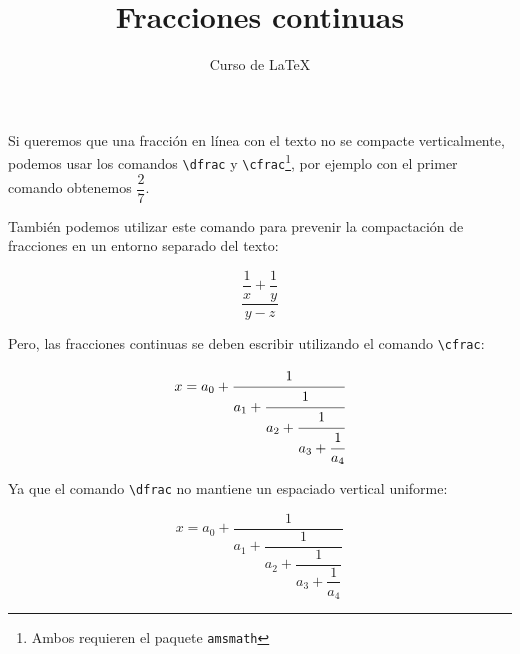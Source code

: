 \documentclass[12pt,letterpaper]{article}
\author{Curso de \LaTeX}
\title{Fracciones continuas}
\begin{document}
\maketitle

Si queremos que una fracción en línea con el texto no se compacte verticalmente, podemos usar los comandos \texttt{\textbackslash dfrac} y \texttt{\textbackslash cfrac}\footnote{Ambos requieren el paquete \texttt{amsmath}}, por ejemplo con el primer comando obtenemos $ \dfrac{2}{7} $.

También podemos utilizar este comando para prevenir la compactación de fracciones en un entorno separado del texto:

\begin{displaymath}
	\frac{\dfrac{1}{x}+\dfrac{1}{y}}{y-z}
\end{displaymath}

Pero, las fracciones continuas se deben escribir utilizando el comando \texttt{\textbackslash cfrac}:

\begin{equation}
  x = a_0 + \cfrac{1}{a_1
          + \cfrac{1}{a_2
          + \cfrac{1}{a_3 + \cfrac{1}{a_4} } } }
\end{equation}

Ya que el comando \texttt{\textbackslash dfrac} no mantiene un espaciado vertical uniforme:

\begin{equation}
	x = a_0 + \dfrac{1}{a_1
		+ \dfrac{1}{a_2
		+ \dfrac{1}{a_3 + \dfrac{1}{a_4} } } }
\end{equation}
\end{document}
